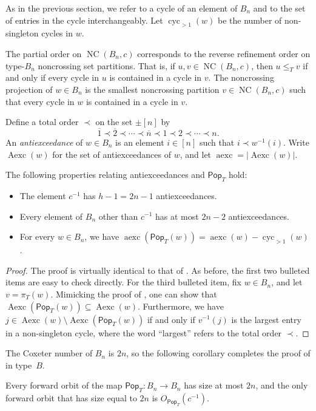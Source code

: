 \documentclass[ALCO,ThmDefs,Unicode,epreuves]{cedram}
\newcommand{\darkblue}{\color{darkblue}}
\newcommand{\defn}[1]{\emph{\darkblue #1}}
\newcommand{\pop}{\mathsf{Pop}}
\DeclareMathOperator{\NC}{NC}
\DeclareMathOperator{\cyc}{cyc}
\DeclareMathOperator{\aexc}{aexc}
\DeclareMathOperator{\Aexc}{Aexc}
\begin{document}
As in the previous section, we refer to a cycle of an element of $B_n$ and to the set of entries in the cycle interchangeably. Let $\cyc_{>1}(w)$ be the number of non-singleton cycles in $w$. 

The partial order on $\NC(B_n,c)$ corresponds to the reverse refinement order on type-$B_n$ noncrossing set partitions. That is, if $u,v\in\NC(B_n,c)$, then $u\leq_T v$ if and only if every cycle in $u$ is contained in a cycle in $v$. The noncrossing projection of $w\in B_n$ is the smallest noncrossing partition $v\in\NC(B_n,c)$ such that every cycle in $w$ is contained in a cycle in $v$. 


Define a total order $\prec$ on the set $\pm[n]$ by 
\[
\overline 1 \prec \overline 2 \prec \cdots \prec \overline n \prec 1 \prec 2 \prec \cdots \prec n.
\]
 An \defn{antiexceedance} of $w \in B_n$ is an element $i\in[n]$ such that $i\prec w^{-1}(i)$. Write $\Aexc(w)$ for the set of antiexceedances of $w$, and let $\aexc=\lvert\Aexc(w)\rvert$. 


\begin{theorem}\label{thm:typeBantiexc}
The following properties relating antiexceedances and $\pop_T$ hold:
\begin{itemize}
  \item The element $c^{-1}$ has $h-1=2n-1$ antiexceedances. 
  \item Every element of $B_n$ other than $c^{-1}$ has at most $2n-2$ antiexceedances. 
  \item For every $w\in B_n$, we have $\aexc(\pop_T(w)) = \aexc(w)-\cyc_{>1}(w)$.  
\end{itemize}
\end{theorem}

\begin{proof}
The proof is virtually identical to that of . As before, the first two bulleted items are easy to check directly. For the third bulleted item, fix $w\in B_n$, and let $v=\pi_T(w)$. Mimicking the proof of , one can show that $\Aexc(\pop_T(w))\subseteq\Aexc(w)$. Furthermore, we have $j\in\Aexc(w)\setminus\Aexc(\pop_T(w))$ if and only if $v^{-1}(j)$ is the largest entry in a non-singleton cycle, where the word ``largest'' refers to the total order $\prec$. 
\end{proof}


The Coxeter number of $B_n$ is $2n$, so the following corollary completes the proof of  in type~$B$. 

\begin{coro}
Every forward orbit of the map $\pop_T:B_n\to B_n$ has size at most $2n$, and the only forward orbit that has size equal to $2n$ is $O_{\pop_T}(c^{-1})$. 
\end{coro}
\end{document}
